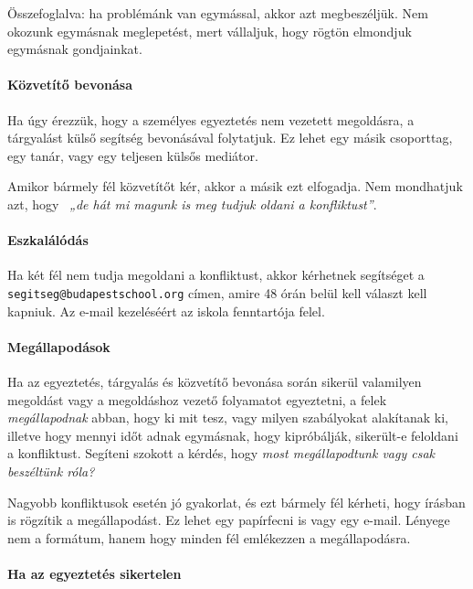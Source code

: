 Összefoglalva: ha problémánk van egymással, akkor azt megbeszéljük. Nem
okozunk egymásnak meglepetést, mert vállaljuk, hogy rögtön elmondjuk
egymásnak gondjainkat.

\hypertarget{kozvetito-bevonasa}{%
\paragraph{Közvetítő bevonása}\label{kozvetito-bevonasa}}

Ha úgy érezzük, hogy a személyes egyeztetés nem vezetett megoldásra, a
tárgyalást külső segítség bevonásával folytatjuk. Ez lehet egy másik
csoporttag, egy tanár, vagy egy teljesen külsős mediátor.

Amikor bármely fél közvetítőt kér, akkor a másik ezt elfogadja. Nem
mondhatjuk azt, hogy ~\emph{„de hát mi magunk is meg tudjuk oldani a
konfliktust''}.

\hypertarget{eszkalalas}{%
\paragraph{Eszkalálódás}\label{eszkalalas}}

Ha két fél nem tudja megoldani a konfliktust, akkor kérhetnek segítséget
a \texttt{segitseg@budapestschool.org} címen, amire 48 órán belül kell
választ kell kapniuk. Az e-mail kezeléséért az iskola fenntartója felel.

\hypertarget{megallapodasok}{%
\paragraph{Megállapodások}\label{megallapodasok}}

Ha az egyeztetés, tárgyalás és közvetítő bevonása során sikerül
valamilyen megoldást vagy a megoldáshoz vezető folyamatot egyeztetni, a
felek \emph{megállapodnak} abban, hogy ki mit tesz, vagy milyen
szabályokat alakítanak ki, illetve hogy mennyi időt adnak egymásnak,
hogy kipróbálják, sikerült-e feloldani a konfliktust. Segíteni szokott a
kérdés, hogy \emph{most megállapodtunk vagy csak beszéltünk róla?}

Nagyobb konfliktusok esetén jó gyakorlat, és ezt bármely fél kérheti, hogy
írásban is rögzítik a megállapodást. Ez lehet egy papírfecni is vagy
egy e-mail. Lényege nem a formátum, hanem hogy minden fél emlékezzen a
megállapodásra.

\hypertarget{ha-az-egyeztetes-sikertelen}{%
\paragraph{Ha az egyeztetés
sikertelen}\label{ha-az-egyeztetes-sikertelen}}

